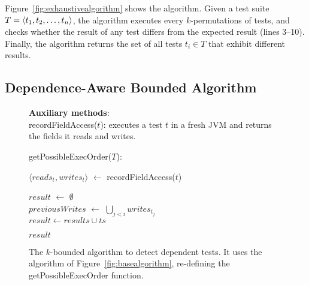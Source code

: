 Figure~\ref{fig:exhaustivealgorithm} shows the algorithm.
Given a test suite $T =  \langle t_1, t_2, \ldots, t_n \rangle $, the
algorithm executes every $k$-permutations of tests,
and checks whether the result of any test differs
from the expected result (lines 3--10). Finally, the algorithm returns the set
of all tests $t_i \in T$
that exhibit different results.





\subsection{Dependence-Aware Bounded Algorithm}
\label{sec:advalgorithm}

\begin{figure}[t]
\textbf{Auxiliary methods}:\\
recordFieldAccess($\mathit{t}$): executes a test $\mathit{t}$ in
a fresh JVM and returns the fields it reads and writes.\\


\vspace{-2mm}

getPossibleExecOrder($T$):\\
\vspace{-5mm}
\begin{algorithmic}[1]
\STATE $\langle \mathit{reads}_t, \mathit{writes}_t\rangle$ $\leftarrow$ recordFieldAccess($\mathit{t}$)\\ 
\ENDFOR

\STATE $\mathit{result}$ $\leftarrow$ $\emptyset$ \\
		\STATE $\mathit{previousWrites}$ $\leftarrow$ $\bigcup_{\mathit{j} < \mathit{i}}  \mathit{writes}_{t_j} $ \\
			\STATE $\mathit{result} \leftarrow \mathit{results} \cup \mathit{ts}$
		\ENDIF
	\ENDFOR

\ENDFOR
\RETURN $\mathit{result}$
\end{algorithmic}

\vspace{-3mm}
\caption {The \dependenceaware{} $k$-bounded algorithm to detect dependent tests.
It uses the algorithm of Figure~\ref{fig:basealgorithm}, re-defining the
getPossibleExecOrder function.
} 
\label{fig:impralg}
\end{figure}

